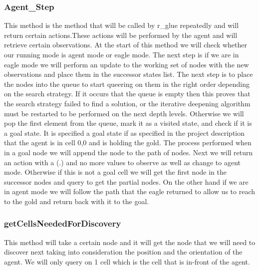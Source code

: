 		\subsubsection*{Agent\_Step}
		This method is the method that will be called by r\_glue repeatedly and will return certain actions.These actions will be performed by the agent and will retrieve certain observations. At the start of this method we will check whether our running mode is agent mode or eagle mode. The next step is if we are in eagle mode we will perform an update to the working set of nodes with the new observations and place them in the successor states list. The next step is to place the nodes into the queue to start queering on them in the right order depending on the search strategy. If it occurs that the queue is empty then this proves that the search strategy failed to find a solution, or the iterative deepening algorithm must be restarted to be performed on the next depth levels. Otherwise we will pop the first element from the queue, mark it as a visited state, and check if it is a goal state. It is specified a goal state if as specified in the project description that the agent is in cell 0,0 and is holding the gold. The process performed when in  a goal node we will append the node to the path of nodes. Next we will return an action with a (.) and no more values to observe as well as change to agent mode. Otherwise if this is not a goal cell we will get the first node in the successor nodes and query to get the partial nodes. On the other hand if we are in agent mode we will follow the path that the eagle returned to allow us to reach to the gold and return back with it to the goal.
		\subsubsection*{getCellsNeededForDiscovery} 
		This method will take a certain node and it will get the node that we will need to discover next taking into consideration the position and the orientation of the agent. We will only query on 1 cell which is the cell that is in-front of the agent.

